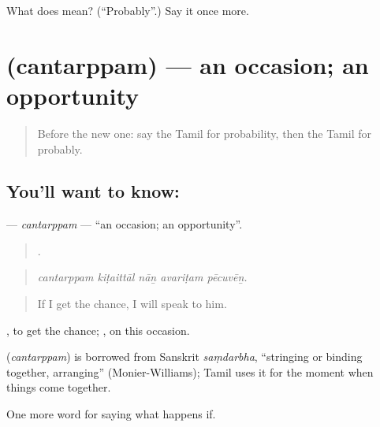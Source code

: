 \begin{tcolorbox}[breakable,colback=teal!4,colframe=teal!35!black,title={Before you move on}]
What does  mean? (\textquotedblleft{}Probably\textquotedblright{}.) Say it once more.
\end{tcolorbox}
\section[\texorpdfstring{\ta{சந்தர்ப்பம்} (cantarppam)}{சந்தர்ப்பம் (cantarppam)}]{ (cantarppam) — an occasion; an opportunity}

\label{lesson:TA-C383-cantarppam}



\begin{quote}
Before the new one: say the Tamil for probability, then the Tamil for probably.
\end{quote}

\subsection*{You'll want to know: }
\textbf{} — \emph{cantarppam} — \textquotedblleft{}an occasion; an opportunity\textquotedblright{}.

\begin{quote}
    .
\end{quote}

\begin{quote}
\emph{cantarppam kiṭaittāl nāṉ avariṭam pēcuvēṉ.}
\end{quote}

\begin{quote}
If I get the chance, I will speak to him.
\end{quote}

 , to get the chance;  , on this occasion.

\begin{cousinweb}
\textbf{} (\emph{cantarppam}) is borrowed from Sanskrit \emph{saṃdarbha}, \textquotedblleft{}stringing or binding together, arranging\textquotedblright{} (Monier-Williams); Tamil uses it for the moment when things come together.
\end{cousinweb}

\begin{grammarlens}[title={What you've built}]
One more word for saying what happens if.
\end{grammarlens}

